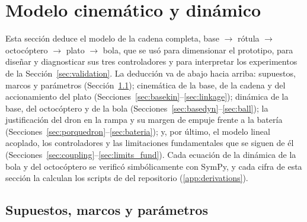 \section{Modelo cinemático y dinámico}
\label{sec:model}

Esta sección deduce el modelo de la cadena completa, base $\to$ rótula $\to$ octocóptero $\to$ plato $\to$ bola, que se usó para dimensionar el prototipo, para diseñar y diagnosticar sus tres controladores y para interpretar los experimentos de la Sección~\ref{sec:validation}. La deducción va de abajo hacia arriba: supuestos, marcos y parámetros (Sección~\ref{sec:assumptions}); cinemática de la base, de la cadena y del accionamiento del plato (Secciones~\ref{sec:basekin}--\ref{sec:linkage}); dinámica de la base, del octocóptero y de la bola (Secciones~\ref{sec:basedyn}--\ref{sec:ball}); la justificación del dron en la rampa y su margen de empuje frente a la batería (Secciones~\ref{sec:porquedron}--\ref{sec:bateria}); y, por último, el modelo lineal acoplado, los controladores y las limitaciones fundamentales que se siguen de él (Secciones~\ref{sec:coupling}--\ref{sec:limits_fund}). Cada ecuación de la dinámica de la bola y del octocóptero se verificó simbólicamente con SymPy, y cada cifra de esta sección la calculan los scripts de  del repositorio (\ref{app:derivations}).

\subsection{Supuestos, marcos y parámetros}
\label{sec:assumptions}

